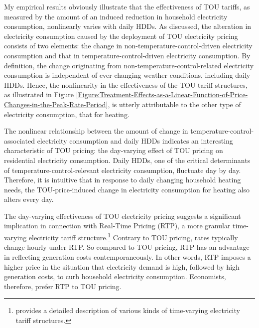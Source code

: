 My empirical results obviously illustrate that the effectiveness of TOU tariffs, as measured by the amount of an induced reduction in household electricity consumption, nonlinearly varies with daily HDDs. As discussed, the alteration in electricity consumption caused by the deployment of TOU electricity pricing consists of two elements: the change in non-temperature-control-driven electricity consumption and that in temperature-control-driven electricity consumption. By definition, the change originating from non-temperature-control-related electricity consumption is independent of ever-changing weather conditions, including daily HDDs. Hence, the nonlinearity in the effectiveness of the TOU tariff structures, as illustrated in Figure \ref{Figure:Treatment-Effects-as-a-Linear-Function-of-Price-Changes-in-the-Peak-Rate-Period}, is utterly attributable to the other type of electricity consumption, that for heating. 

The nonlinear relationship between the amount of change in temperature-control-associated electricity consumption and daily HDDs indicates an interesting characteristic of TOU pricing: the day-varying effect of TOU pricing on residential electricity consumption. Daily HDDs, one of the critical determinants of temperature-control-relevant electricity consumption, fluctuate day by day. Therefore, it is intuitive that in response to daily changing household heating needs, the TOU-price-induced change in electricity consumption for heating also alters every day. 

The day-varying effectiveness of TOU electricity pricing suggests a significant implication in connection with Real-Time Pricing (RTP), a more granular time-varying electricity tariff structure.\footnote{\cite{Household-Responses-to-Time-Varying-Electricity-Prices_Harding-and-Sexton_2017} provides a detailed description of various kinds of time-varying electricity tariff structures.} Contrary to TOU pricing, rates typically change hourly under RTP. So compared to TOU pricing, RTP has an advantage in reflecting generation costs contemporaneously. In other words, RTP imposes a higher price in the situation that electricity demand is high, followed by high generation costs, to curb household electricity consumption. Economists, therefore, prefer RTP to TOU pricing. 

